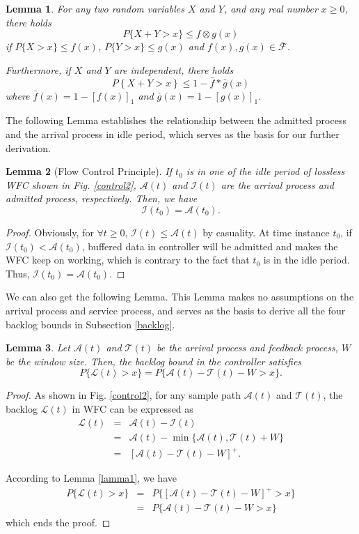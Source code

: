 \documentclass[paper]{ieice}
\newtheorem{lemma}{Lemma}
\newtheorem{proof}{Proof}
\begin{document}
\begin{lemma}\label{lamma3}
For any two random variables $X$ and $Y$, and any real number $x\geq 0$, there holds
$$P\{X+Y>x\}\leq f\otimes g(x)$$
if $P\{X>x\}\leq f(x)$, $P\{Y>x\}\leq g(x)$ and $f(x),g(x)\in\bar{\mathcal{F}}$.

Furthermore, if $X$ and $Y$ are independent, there holds
$$P\left\{X+Y>x\right\}\leq 1-\bar{f}\ast\bar{g}(x)$$
where $\bar{f}(x)=1-[f(x)]_1$ and $\bar{g}(x)=1-[g(x)]_1$.
\end{lemma}

The following Lemma establishes the relationship between the admitted process and the arrival process in idle period, which serves as the basis for our further derivation.
\begin{lemma}[Flow Control Principle]\label{lama1}
If $t_0$ is in one of the idle period of lossless WFC shown in Fig. \ref{control2}, $\mathcal{A}(t)$ and $\mathcal{I}(t)$ are the arrival process and admitted process, respectively. Then, we have
\begin{equation}
\mathcal{I}(t_0)=\mathcal{A}(t_0).
\end{equation}
\end{lemma}
\begin{proof}
Obviously, for $\forall t\geq 0$, $\mathcal{I}(t)\leq \mathcal{A}(t)$ by casuality. At time instance $t_0$, if $\mathcal{I}(t_0)<\mathcal{A}(t_0)$, buffered data in controller will be admitted and makes the WFC keep on working, which is contrary to the fact that $t_0$ is in the idle period. Thus, $\mathcal{I}(t_0)=\mathcal{A}(t_0)$.\QED
\end{proof}

We can also get the following Lemma. This Lemma makes no assumptions on the arrival process and service process, and serves as the basis to derive all the four backlog bounds in Subsection \ref{backlog}.
\begin{lemma}\label{lama2}
Let $\mathcal{A}(t)$ and $\mathcal{T}(t)$ be the arrival process and feedback process, $W$ be the window size. Then, the backlog bound in the controller satisfies
$$P\{\mathcal{L}(t)> x\}=P\{\mathcal{A}(t)-\mathcal{T}(t)-W> x\}.$$
\end{lemma}
\begin{proof}
As shown in Fig. \ref{control2}, for any sample path $\mathcal{A}(t)$ and $\mathcal{T}(t)$, the backlog $\mathcal{L}(t)$ in WFC can be expressed as
\begin{eqnarray}
  \mathcal{L}(t)&=&\mathcal{A}(t)-\mathcal{I}(t)\nonumber\\
      &=&\mathcal{A}(t)-\min\{\mathcal{A}(t),\mathcal{T}(t)+W\}\nonumber\\
      &=&[\mathcal{A}(t)-\mathcal{T}(t)-W]^+.\nonumber
\end{eqnarray}

According to Lemma \ref{lamma1}, we have
\begin{eqnarray*}
  P\{\mathcal{L}(t)>x\}&=&P\{[\mathcal{A}(t)-\mathcal{T}(t)-W]^+>x\}\\
  &=&P\{\mathcal{A}(t)-\mathcal{T}(t)-W>x\}
\end{eqnarray*}
which ends the proof.\QED
\end{proof}
\end{document}
